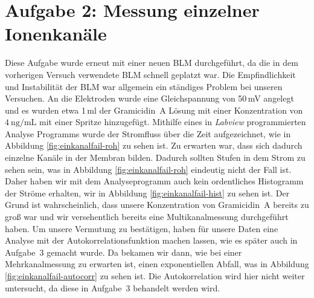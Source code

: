 \documentclass[a4paper,ngerman]{scrartcl}
\begin{document}
\section{Aufgabe 2: Messung einzelner Ionenkanäle}
Diese Aufgabe wurde erneut mit einer neuen BLM durchgeführt, da die in dem vorherigen Versuch verwendete BLM schnell geplatzt war.
Die Empfindlichkeit und Instabilität der BLM war allgemein ein ständiges Problem bei unseren Versuchen.
An die Elektroden wurde eine Gleichspannung von 50\,mV angelegt und es wurden etwa 1\,ml der Gramicidin~A Lösung mit einer Konzentration von $\SI{4}{\nano\gram\per\milli\liter}$ mit einer Spritze hinzugefügt. Mithilfe eines in \emph{Labview} programmierten Analyse Programms wurde 
der Stromfluss über die Zeit aufgezeichnet, wie in Abbildung \ref{fig:einkanalfail-roh} zu sehen ist.
Zu erwarten war, dass sich dadurch einzelne Kanäle in der Membran bilden. 
Dadurch sollten Stufen in dem Strom zu sehen sein, was in Abbildung \ref{fig:einkanalfail-roh} eindeutig nicht der Fall ist. 
Daher haben wir mit dem Analyseprogramm auch kein ordentliches Histogramm der Ströme erhalten, wir in Abbildung \ref{fig:einkanalfail-hist} zu sehen ist. 
Der Grund ist wahrscheinlich, dass unsere Konzentration von Gramicidin~A bereits zu groß war und wir versehentlich bereits eine Multikanalmessung durchgeführt haben. Um unsere Vermutung zu bestätigen, haben für unsere Daten eine Analyse mit der Autokorrelationsfunktion machen lassen,
wie es später auch in Aufgabe~3 gemacht wurde. 
Da bekamen wir dann, wie bei einer Mehrkanalmessung zu erwarten ist, einen exponentiellen Abfall, 
was in Abbildung \ref{fig:einkanalfail-autocorr} zu sehen ist. 
Die Autokorrelation wird hier nicht weiter untersucht, da diese in Aufgabe~3 behandelt werden wird.\\
\end{document}
